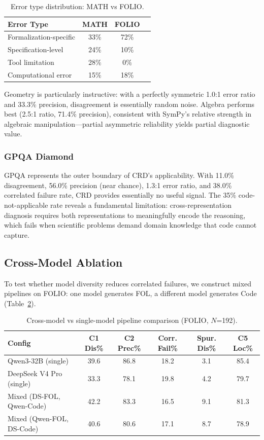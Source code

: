 \documentclass[11pt,a4paper]{article}
\begin{document}
\begin{table}[t]
\centering
\small
\caption{Error type distribution: MATH vs FOLIO.}
\label{tab:error_types}
\begin{tabular}{lccc}
\toprule
\textbf{Error Type} & \textbf{MATH} & \textbf{FOLIO} \\
\midrule
Formalization-specific & 33\% & 72\% \\
Specification-level & 24\% & 10\% \\
Tool limitation & 28\% & 0\% \\
Computational error & 15\% & 18\% \\
\bottomrule
\end{tabular}
\end{table}

Geometry is particularly instructive: with a perfectly symmetric 1.0:1 error ratio and 33.3\% precision, disagreement is essentially random noise. Algebra performs best (2.5:1 ratio, 71.4\% precision), consistent with SymPy's relative strength in algebraic manipulation---partial asymmetric reliability yields partial diagnostic value.

\subsubsection{GPQA Diamond}

GPQA represents the outer boundary of CRD's applicability. With 11.0\% disagreement, 56.0\% precision (near chance), 1.3:1 error ratio, and 38.0\% correlated failure rate, CRD provides essentially no useful signal. The 35\% code-not-applicable rate reveals a fundamental limitation: cross-representation diagnosis requires both representations to meaningfully encode the reasoning, which fails when scientific problems demand domain knowledge that code cannot capture.

\subsection{Cross-Model Ablation}
\label{sec:cross_model}

To test whether model diversity reduces correlated failures, we construct mixed pipelines on FOLIO: one model generates FOL, a different model generates Code (Table~\ref{tab:cross_model}).

\begin{table}[t]
\centering
\small
\caption{Cross-model vs single-model pipeline comparison (FOLIO, $N$=192).}
\label{tab:cross_model}
\begin{tabular}{lccccc}
\toprule
\textbf{Config} & \textbf{C1 Dis\%} & \textbf{C2 Prec\%} & \textbf{Corr. Fail\%} & \textbf{Spur. Dis\%} & \textbf{C5 Loc\%} \\
\midrule
Qwen3-32B (single) & 39.6 & 86.8 & 18.2 & 3.1 & 85.4 \\
DeepSeek V4 Pro (single) & 33.3 & 78.1 & 19.8 & 4.2 & 79.7 \\
Mixed (DS-FOL, Qwen-Code) & 42.2 & 83.3 & 16.5 & 9.1 & 81.3 \\
Mixed (Qwen-FOL, DS-Code) & 40.6 & 80.6 & 17.1 & 8.7 & 78.9 \\
\bottomrule
\end{tabular}
\end{table}
\end{document}
